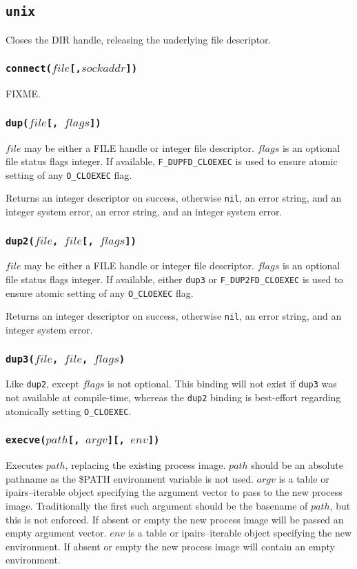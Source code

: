 \documentclass[11pt, oneside]{memoir}
\newcommand*{\nil}[0]{\texttt{nil}\xspace}
\newcommand*{\syscall}[1]{\texttt{#1}\xspace}
\newcommand*{\fn}[1]{\texttt{#1}\xspace}
\newcommand*{\otherwise}[1]{otherwise #1, an error string, and an integer system error}
\newcounter{toccols}
\newenvironment{Module}[1]{
	\subsection{\texttt{#1}}
	\addtocontents{toc}{
		\protect\begin{multicols}{\value{toccols}}
	}
}{
	\addtocontents{toc}{\protect\end{multicols}}
}
\begin{document}
\begin{Module}{unix}
Closes the DIR handle, releasing the underlying file descriptor.

\subsubsection[\fn{connect}]{\fn{connect($file$[,$sockaddr$])}}

FIXME.

\subsubsection[\fn{dup}]{\fn{dup($file$[, $flags$])}}

$file$ may be either a FILE handle or integer file descriptor. $flags$ is an optional file status flags integer. If available, \syscall{F\_DUPFD\_CLOEXEC} is used to ensure atomic setting of any \syscall{O\_CLOEXEC} flag.

Returns an integer descriptor on success, \otherwise{\nil}, an error string, and an integer system error.

\subsubsection[\fn{dup2}]{\fn{dup2($file$, $file$[, $flags$])}}

$file$ may be either a FILE handle or integer file descriptor. $flags$ is an optional file status flags integer. If available, either \syscall{dup3} or \syscall{F\_DUP2FD\_CLOEXEC} is used to ensure atomic setting of any \syscall{O\_CLOEXEC} flag.

Returns an integer descriptor on success, \otherwise{\nil}.

\subsubsection[\fn{dup3}]{\fn{dup3($file$, $file$, $flags$)}}

Like \syscall{dup2}, except $flags$ is not optional. This binding will not exist if \syscall{dup3} was not available at compile-time, whereas the \syscall{dup2} binding is best-effort regarding atomically setting \syscall{O\_CLOEXEC}.

\subsubsection[\fn{execve}]{\fn{execve($path$[, $argv$][, $env$])}}

Executes $path$, replacing the existing process image. $path$ should be an absolute pathname as the \$PATH environment variable is not used. $argv$ is a table or ipairs--iterable object specifying the argument vector to pass to the new process image. Traditionally the first such argument should be the basename of $path$, but this is not enforced. If absent or empty the new process image will be passed an empty argument vector. $env$ is a table or ipairs--iterable object specifying the new environment. If absent or empty the new process image will contain an empty environment.


\end{Module}
\end{document}
